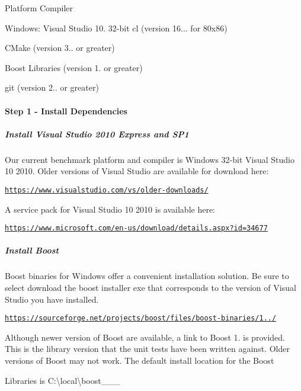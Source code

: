\begin{DoxyItemize}
\item Platform Compiler
\begin{DoxyItemize}
\item Windows\+: Visual Studio 10. 32-\/bit cl (version 16... for 80x86)
\end{DoxyItemize}
\item C\+Make (version 3.. or greater)
\item Boost Libraries (version 1. or greater)
\item git (version 2.. or greater)
\end{DoxyItemize}

\paragraph*{Step 1 -\/ Install Dependencies}

\subparagraph*{Install Visual Studio 2010 Express and S\+P1}

Our current benchmark platform and compiler is Windows 32-\/bit Visual Studio 10 2010. Older versions of Visual Studio are available for download here\+:

\href{https://www.visualstudio.com/vs/older-downloads/}{\tt https\+://www.\+visualstudio.\+com/vs/older-\/downloads/}

A service pack for Visual Studio 10 2010 is available here\+:

\href{https://www.microsoft.com/en-us/download/details.aspx?id=34677}{\tt https\+://www.\+microsoft.\+com/en-\/us/download/details.\+aspx?id=34677}

\subparagraph*{Install Boost}

Boost binaries for Windows offer a convenient installation solution. Be sure to select download the boost installer exe that corresponds to the version of Visual Studio you have installed.

\href{https://sourceforge.net/projects/boost/files/boost-binaries/1.58.0/}{\tt https\+://sourceforge.\+net/projects/boost/files/boost-\/binaries/1../}

Although newer version of Boost are available, a link to Boost 1. is provided. This is the library version that the unit tests have been written against. Older versions of Boost may not work. The default install location for the Boost

Libraries is {\ttfamily C\+:\textbackslash{}local\textbackslash{}boost\+\_\+\_\+\_}


